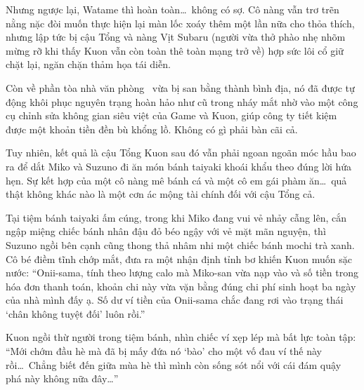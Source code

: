 \documentclass[../main.tex]{subfiles}
\begin{document}
Nhưng ngược lại,  Watame thì hoàn toàn\dots\ không có sợ. Cô nàng vẫn trơ trẽn nằng nặc đòi muốn thực hiện lại màn lốc xoáy thêm một lần nữa cho thỏa thích, nhưng lập tức bị cậu Tổng và nàng Vịt Subaru (người vừa thở phào nhẹ nhõm mừng rỡ khi thấy Kuon vẫn còn toàn thê toàn mạng trở về) hợp sức lôi cổ giữ chặt lại, ngăn chặn thảm họa tái diễn.

Còn về phần tòa nhà văn phòng \hll\ vừa bị san bằng thành bình địa, nó đã được tự động khôi phục nguyên trạng hoàn hảo như cũ trong nháy mắt nhờ vào một công cụ chỉnh sửa không gian siêu việt của Game và Kuon, giúp công ty tiết kiệm được một khoản tiền đền bù khổng lồ. Không có gì phải bàn cãi cả.

Tuy nhiên, kết quả là cậu Tổng Kuon sau đó vẫn phải ngoan ngoãn móc hầu bao ra để dắt Miko và Suzuno đi ăn món bánh taiyaki khoái khẩu theo đúng lời hứa hẹn. Sự kết hợp của một cô nàng mê bánh cá và một cô em gái phàm ăn\dots\ quả thật không khác nào là một cơn ác mộng tài chính đối với cậu Tổng cả.

Tại tiệm bánh taiyaki ấm cúng, trong khi Miko đang vui vẻ nhảy cẫng lên, cắn ngập miệng chiếc bánh nhân đậu đỏ béo ngậy với vẻ mặt mãn nguyện, thì Suzuno ngồi bên cạnh cũng thong thả nhâm nhi một chiếc bánh mochi trà xanh. Cô bé điềm tĩnh chớp mắt, đưa ra một nhận định tỉnh bơ khiến Kuon muốn sặc nước: ``Onii-sama, tính theo lượng calo mà Miko-san vừa nạp vào và số tiền trong hóa đơn thanh toán, khoản chi này vừa vặn bằng đúng chi phí sinh hoạt ba ngày của nhà mình đấy ạ. Số dư ví tiền của Onii-sama chắc đang rơi vào trạng thái `chân không tuyệt đối' luôn rồi.''

Kuon ngồi thừ người trong tiệm bánh, nhìn chiếc ví xẹp lép mà bất lực toàn tập: ``Mới chớm đầu hè mà đã bị mấy đứa nó `bào' cho một vố đau ví thế này rồi\dots\ Chẳng biết đến giữa mùa hè thì mình còn sống sót nổi với cái đám quậy phá này không nữa đây\dots''
\end{document}
